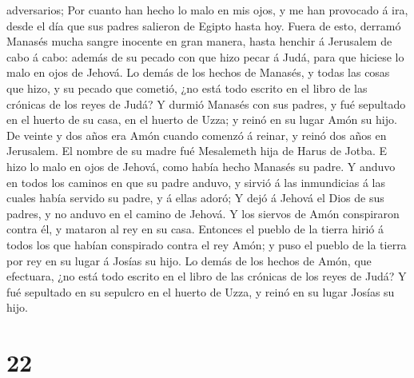 adversarios;  Por cuanto han hecho lo malo en mis ojos, y
me han provocado á ira, desde el día que sus padres salieron de Egipto
hasta hoy.  Fuera de esto, derramó Manasés mucha sangre
inocente en gran manera, hasta henchir á Jerusalem de cabo á cabo:
además de su pecado con que hizo pecar á Judá, para que hiciese lo malo
en ojos de Jehová.  Lo demás de los hechos de Manasés, y
todas las cosas que hizo, y su pecado que cometió, ¿no está todo escrito
en el libro de las crónicas de los reyes de Judá?  Y
durmió Manasés con sus padres, y fué sepultado en el huerto de su casa,
en el huerto de Uzza; y reinó en su lugar Amón su hijo. 
De veinte y dos años era Amón cuando comenzó á reinar, y reinó dos años
en Jerusalem. El nombre de su madre fué Mesalemeth hija de Harus de
Jotba.  E hizo lo malo en ojos de Jehová, como había
hecho Manasés su padre.  Y anduvo en todos los caminos en
que su padre anduvo, y sirvió á las inmundicias á las cuales había
servido su padre, y á ellas adoró;  Y dejó á Jehová el
Dios de sus padres, y no anduvo en el camino de Jehová. 
Y los siervos de Amón conspiraron contra él, y mataron al rey en su
casa.  Entonces el pueblo de la tierra hirió á todos los
que habían conspirado contra el rey Amón; y puso el pueblo de la tierra
por rey en su lugar á Josías su hijo.  Lo demás de los
hechos de Amón, que efectuara, ¿no está todo escrito en el libro de las
crónicas de los reyes de Judá?  Y fué sepultado en su
sepulcro en el huerto de Uzza, y reinó en su lugar Josías su hijo.

\hypertarget{section-21}{%
\section{22}\label{section-21}}

